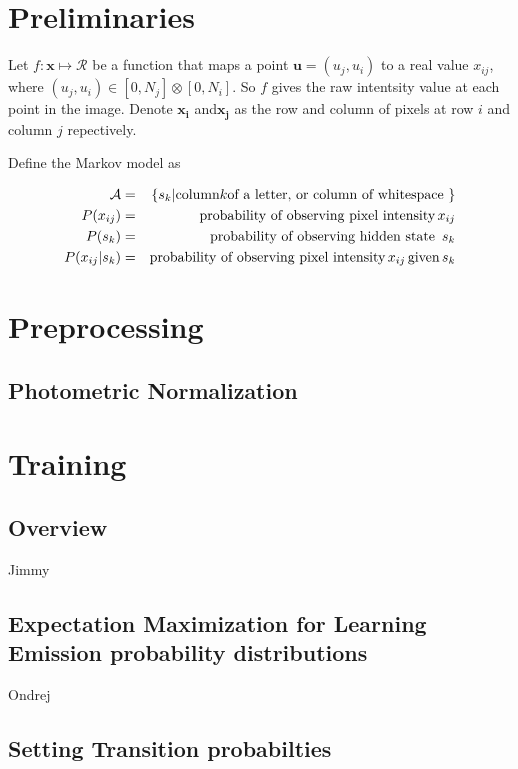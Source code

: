 \documentclass[a4paper,12pt]{article}
\begin{document}
  \pagestyle{empty}

  \section{Preliminaries}
  Let $f : \mathbf{x} \mapsto \mathcal{R}$ be a function that maps a point $\mathbf{u} = (u_j,u_i)$ to a real value $x_{ij}$, where $(u_j,u_i) \in [0,N_j] \otimes [0,N_i]$.  So $f$ gives the raw intentsity value at each point in the image.  Denote $\mathbf{x_i}$ and$\mathbf{x_j}$  as the row and column of pixels at row $i$ and column $j$ repectively.  

  Define the Markov model as 

  \begin{eqnarray*}
    \mathcal{A} &=& \{ s_k | \text{column} k \text{of a letter, or column of whitespace \}} \\
    P(x_{ij}) &=& \text{probability of observing pixel intensity\,} x_{ij} \\
    P(s_k) &=& \text{probability of observing hidden state \,} s_{k} \\
    P(x_{ij}|s_k) &=& \text{probability of observing pixel intensity\,} x_{ij} \text{\,given\,} s_k  
    

  \end{eqnarray*}

  \section{Preprocessing}
  \subsection{Photometric Normalization}

  \section{Training}
  \subsection{Overview}
  Jimmy

  \subsection{Expectation Maximization for Learning Emission probability distributions}
  Ondrej

  \subsection{Setting Transition probabilties}
\end{document}
